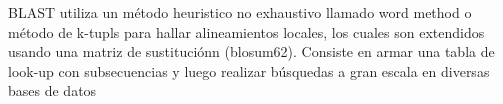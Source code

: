% 

BLAST utiliza un método heuristico no exhaustivo llamado word method  o método de k-tupls
para hallar alineamientos locales, los cuales son extendidos usando una matriz de sustituciónn (blosum62). 
Consiste en armar una tabla de look-up con subsecuencias y luego realizar búsquedas a gran escala en diversas bases de datos

% 
% 
% 
% 
% 


























